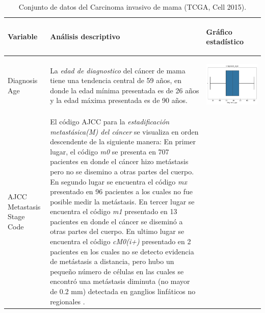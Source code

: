 \begin{table}[!htb]
	\footnotesize
	\begin{threeparttable}
		\caption{Conjunto de datos del Carcinoma invasivo de mama (TCGA, Cell 2015).}
		\label{Analisis_Descriptivo}
		\begin{tabular}{p{2.5cm} p{7cm} p{6.5cm}} \toprule
			\begin{center}Variable\end{center}   	 
			&\begin{center}Análisis descriptivo\end{center}             
			&\begin{center}Gráfico estadístico\end{center}\\ \hline
			Diagnosis Age
			& La \textit{edad de diagnostico} del cáncer de mama tiene una tendencia central de 59 años, en donde la edad mínima presentada es de  26 años y la edad máxima presentada es de 90 años.
			
			& \begin{center}\includegraphics[width=1\linewidth]{NOTEBOOK/IMAGENES_DESCRIPTIVAS/1_diagnosis_age}\end{center}
			\\ \hline
			AJCC Metastasis Stage Code 
			& El código AJCC para la \textit{estadificación metastásica(M) del cáncer} se visualiza en orden descendente de la siguiente manera: En primer lugar, el código \textit{m0} se presenta en 707 pacientes en donde el cáncer hizo metástasis pero no se  disemino a otras partes del cuerpo. En segundo lugar se encuentra el código \textit{mx} presentado en 96 pacientes a los cuales no fue posible medir la metástasis. En tercer lugar se encuentra el código \textit{m1} presentado en 13 pacientes en donde el cáncer se diseminó a otras partes del cuerpo. En ultimo lugar se encuentra el código \textit{cM0(i+)} presentado en 2 pacientes en los cuales no se detecto evidencia de metástasis a distancia, pero hubo un pequeño número de células en las cuales se encontró una metástasis diminuta (no mayor de 0.2 mm) detectada en ganglios linfáticos no regionales \cite{NCI}.
			

\end{tabular}
\end{threeparttable}
\end{table}
